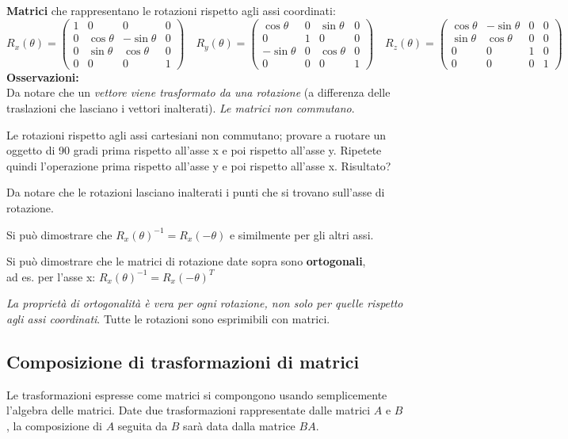 \documentclass[a4paper, 10pt]{article}
\begin{document}
		\noindent
		\textbf{Matrici} che rappresentano le rotazioni rispetto agli assi coordinati:
		\[
			R_x(\theta) =
			\begin{pmatrix}
				1 & 0 & 0 & 0 \\
				0 & \cos\theta & -\sin\theta & 0 \\
				0 & \sin\theta & \cos\theta & 0 \\
				0 & 0 & 0 & 1
			\end{pmatrix}
			\quad
			R_y(\theta) =
			\begin{pmatrix}
			\cos\theta & 0 & \sin\theta & 0 \\
			0 & 1 & 0 & 0 \\
			-\sin\theta & 0 & \cos\theta & 0 \\
			0 & 0 & 0 & 1
			\end{pmatrix}
			\quad
			R_z(\theta) =
			\begin{pmatrix}
			\cos\theta & -\sin\theta & 0 & 0 \\
			\sin\theta & \cos\theta & 0 & 0 \\
			0 & 0 & 1 & 0 \\
			0 & 0 & 0 & 1
			\end{pmatrix}
		\]
		\textbf{Osservazioni:}\\
		Da notare che un \textit{vettore viene
		trasformato da una rotazione} (a
		differenza delle traslazioni che
		lasciano i vettori inalterati). \textit{Le matrici non commutano}.
		
		\noindent
		Le rotazioni rispetto agli assi cartesiani non commutano;
		provare a ruotare un oggetto di 90 gradi prima rispetto all'asse
		x e poi rispetto all'asse y. Ripetete quindi l'operazione prima
		rispetto all'asse y e poi rispetto all'asse x. Risultato?
		
		\noindent
		Da notare che le rotazioni lasciano inalterati i punti che si
		trovano sull'asse di rotazione.
		
		Si può dimostrare che $ R_x(\theta)^{-1} = R_x(-\theta) $ e similmente per gli
		altri assi.
		
		Si può dimostrare che le matrici di rotazione date sopra sono
		\textbf{ortogonali},\\
		 ad es. per l'asse x: $ R_x(\theta)^{-1} = R_x(-\theta)^T $
		
		\textit{La proprietà di ortogonalità è vera per ogni rotazione, non solo
		per quelle rispetto agli assi coordinati}.
		Tutte le rotazioni sono esprimibili con matrici.
		
	\subsection{Composizione di trasformazioni di matrici}
		Le trasformazioni espresse come matrici si compongono
		usando semplicemente l'algebra delle matrici.
		Date due trasformazioni rappresentate dalle matrici $A$ e $B$, la
		composizione di $A$ seguita da $B$ sarà data dalla matrice $BA$.
\end{document}
